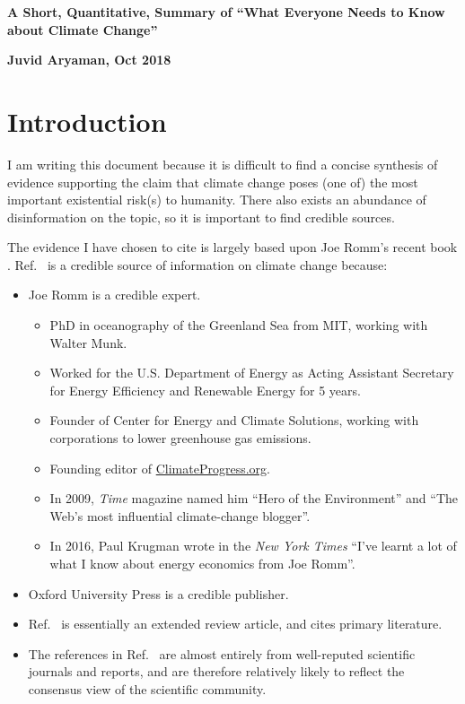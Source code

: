 \documentclass[11pt]{article}
\begin{document}
\newcommand{\cotwo}{CO\textsubscript{2}}
\newcommand{\meth}{CH\textsubscript{4}}

\begin{flushleft}
\textsf{\textbf{\large{A Short, Quantitative, Summary of ``What Everyone Needs to Know about Climate Change''}}}
\end{flushleft}

\begin{flushleft}
\textsf{\textbf{Juvid Aryaman, Oct 2018}}
\end{flushleft}

\section{Introduction}



I am writing this document because it is difficult to find a concise synthesis of evidence supporting the claim that climate change poses (one of) the most important existential risk(s) to humanity. There also exists an abundance of disinformation on the topic, so it is important to find credible sources.

The evidence I have chosen to cite is largely based upon Joe Romm's recent book \cite{Romm18}. Ref.~\cite{Romm18} is a credible source of information on climate change because:
\begin{itemize}
\item Joe Romm is a credible expert.
\begin{itemize}
\item PhD in oceanography of the Greenland Sea from MIT, working with Walter Munk.
\item Worked for the U.S. Department of Energy as Acting Assistant Secretary for Energy Efficiency and Renewable Energy for 5 years.
\item Founder of Center for Energy and Climate Solutions, working with corporations to lower greenhouse gas emissions.
\item Founding editor of \url{ClimateProgress.org}.
\item In 2009, \textit{Time} magazine named him ``Hero of the Environment'' and ``The Web's most influential climate-change blogger''.
\item In 2016, Paul Krugman wrote in the \textit{New York Times} ``I've learnt a lot of what I know about energy economics from Joe Romm''.
\end{itemize}
\item Oxford University Press is a credible publisher.
\item Ref.~\cite{Romm18} is essentially an extended review article, and cites primary literature.
\item The references in Ref.~\cite{Romm18} are almost entirely from well-reputed scientific journals and reports, and are therefore relatively likely to reflect the consensus view of the scientific community.
\end{itemize}
\end{document}
